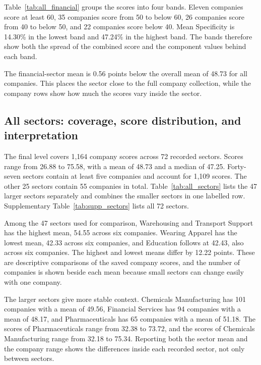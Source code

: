 Table~\ref{tab:all_financial} groups the scores into four bands. Eleven companies score at least 60, 35 companies score from 50 to below 60, 26 companies score from 40 to below 50, and 22 companies score below 40. Mean Specificity is 14.30\% in the lowest band and 47.24\% in the highest band. The bands therefore show both the spread of the combined score and the component values behind each band.

The financial-sector mean is 0.56 points below the overall mean of 48.73 for all companies. This places the sector close to the full company collection, while the company rows show how much the scores vary inside the sector.

\FloatBarrier
\subsection{All sectors: coverage, score distribution, and interpretation}
\label{sec:all_sectors}

The final level covers 1,164 company scores across 72 recorded sectors. Scores range from 26.88 to 75.58, with a mean of 48.73 and a median of 47.25. Forty-seven sectors contain at least five companies and account for 1,109 scores. The other 25 sectors contain 55 companies in total. Table~\ref{tab:all_sectors} lists the 47 larger sectors separately and combines the smaller sectors in one labelled row. Supplementary Table~\ref{tab:supp_sectors} lists all 72 sectors.

Among the 47 sectors used for comparison, Warehousing and Transport Support has the highest mean, 54.55 across six companies. Wearing Apparel has the lowest mean, 42.33 across six companies, and Education follows at 42.43, also across six companies. The highest and lowest means differ by 12.22 points. These are descriptive comparisons of the saved company scores, and the number of companies is shown beside each mean because small sectors can change easily with one company.

The larger sectors give more stable context. Chemicals Manufacturing has 101 companies with a mean of 49.56, Financial Services has 94 companies with a mean of 48.17, and Pharmaceuticals has 65 companies with a mean of 51.18. The scores of Pharmaceuticals range from 32.38 to 73.72, and the scores of Chemicals Manufacturing range from 32.18 to 75.34. Reporting both the sector mean and the company range shows the differences inside each recorded sector, not only between sectors.

